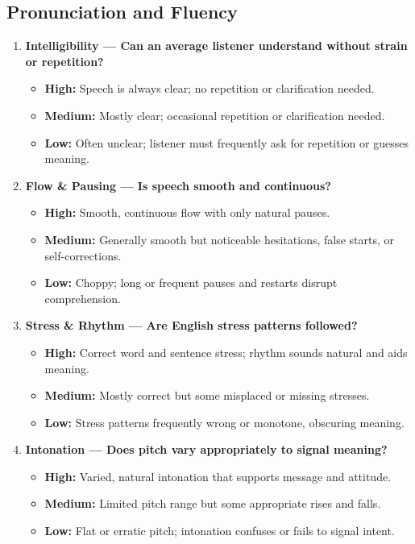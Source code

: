 \documentclass{report}
\begin{document}
\subsection*{Pronunciation and Fluency}
\begin{enumerate}
  \item \textbf{Intelligibility — Can an average listener understand without strain or repetition?}
  \begin{itemize}
    \item \textbf{High:} Speech is always clear; no repetition or clarification needed.
    \item \textbf{Medium:} Mostly clear; occasional repetition or clarification needed.
    \item \textbf{Low:} Often unclear; listener must frequently ask for repetition or guesses meaning.
  \end{itemize}

  \item \textbf{Flow \& Pausing — Is speech smooth and continuous?}
  \begin{itemize}
    \item \textbf{High:} Smooth, continuous flow with only natural pauses.
    \item \textbf{Medium:} Generally smooth but noticeable hesitations, false starts, or self-corrections.
    \item \textbf{Low:} Choppy; long or frequent pauses and restarts disrupt comprehension.
  \end{itemize}

  \item \textbf{Stress \& Rhythm — Are English stress patterns followed?}
  \begin{itemize}
    \item \textbf{High:} Correct word and sentence stress; rhythm sounds natural and aids meaning.
    \item \textbf{Medium:} Mostly correct but some misplaced or missing stresses.
    \item \textbf{Low:} Stress patterns frequently wrong or monotone, obscuring meaning.
  \end{itemize}

  \item \textbf{Intonation — Does pitch vary appropriately to signal meaning?}
  \begin{itemize}
    \item \textbf{High:} Varied, natural intonation that supports message and attitude.
    \item \textbf{Medium:} Limited pitch range but some appropriate rises and falls.
    \item \textbf{Low:} Flat or erratic pitch; intonation confuses or fails to signal intent.
  \end{itemize}


\end{enumerate}
\end{document}
